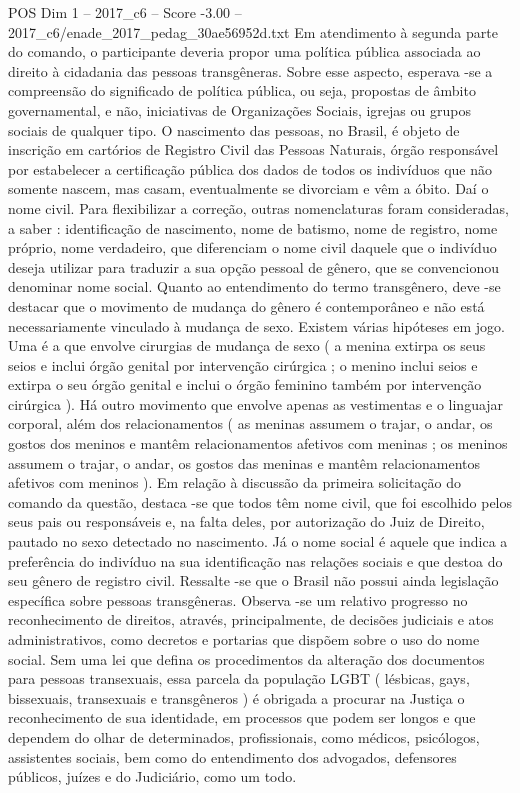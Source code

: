 \begin{textsample}{POS Dim 1 – 2017\_c6 – Score -3.00 – 2017\_c6/enade\_2017\_pedag\_30ae56952d.txt}
Em atendimento à segunda parte do comando, o participante deveria propor uma política pública associada ao direito à cidadania das pessoas transgêneras.
Sobre esse aspecto, esperava -se a compreensão do significado de política pública, ou seja, propostas de âmbito governamental, e não, iniciativas de Organizações Sociais, igrejas ou grupos sociais de qualquer tipo.
O nascimento das pessoas, no Brasil, é objeto de inscrição em cartórios de Registro Civil das Pessoas Naturais, órgão responsável por estabelecer a certificação pública dos dados de todos os indivíduos que não somente nascem, mas casam, eventualmente se divorciam e vêm a óbito.
Daí o nome civil.
Para flexibilizar a correção, outras nomenclaturas foram consideradas, a saber : identificação de nascimento, nome de batismo, nome de registro, nome próprio, nome verdadeiro, que diferenciam o nome civil daquele que o indivíduo deseja utilizar para traduzir a sua opção pessoal de gênero, que se convencionou denominar nome social.
Quanto ao entendimento do termo transgênero, deve -se destacar que o movimento de mudança do gênero é contemporâneo e não está necessariamente vinculado à mudança de sexo.
Existem várias hipóteses em jogo.
Uma é a que envolve cirurgias de mudança de sexo ( a menina extirpa os seus seios e inclui órgão genital por intervenção cirúrgica ; o menino inclui seios e extirpa o seu órgão genital e inclui o órgão feminino também por intervenção cirúrgica ).
Há outro movimento que envolve apenas as vestimentas e o linguajar corporal, além dos relacionamentos ( as meninas assumem o trajar, o andar, os gostos dos meninos e mantêm relacionamentos afetivos com meninas ; os meninos assumem o trajar, o andar, os gostos das meninas e mantêm relacionamentos afetivos com meninos ).
Em relação à discussão da primeira solicitação do comando da questão, destaca -se que todos têm nome civil, que foi escolhido pelos seus pais ou responsáveis e, na falta deles, por autorização do Juiz de Direito, pautado no sexo detectado no nascimento.
Já o nome social é aquele que indica a preferência do indivíduo na sua identificação nas relações sociais e que destoa do seu gênero de registro civil.
Ressalte -se que o Brasil não possui ainda legislação específica sobre pessoas transgêneras.
Observa -se um relativo progresso no reconhecimento de direitos, através, principalmente, de decisões judiciais e atos administrativos, como decretos e portarias que dispõem sobre o uso do nome social.
Sem uma lei que defina os procedimentos da alteração dos documentos para pessoas transexuais, essa parcela da população LGBT ( lésbicas, gays, bissexuais, transexuais e transgêneros ) é obrigada a procurar na Justiça o reconhecimento de sua identidade, em processos que podem ser longos e que dependem do olhar de determinados, profissionais, como médicos, psicólogos, assistentes sociais, bem como do entendimento dos advogados, defensores públicos, juízes e do Judiciário, como um todo.

\end{textsample}

